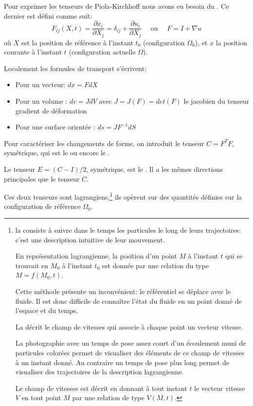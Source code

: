 \medskip
Pour exprimer les tenseurs de Piola-Kirchhoff 
nous avons eu besoin du . Ce dernier est défini comme suit:
\begin{equation} F_{ij}(X,t) = \dfrac{\partial x_i}{\partial X_j} = \delta_{ij} + \frac{\partial u_i}{\partial X_j} 
\quad \text{ ou } \quad F = I + \nabla u\end{equation}
où $X$ est la position de référence à l'instant $t_0$ (configuration $\Omega_0$), et $x$ la position 
courante à l'instant $t$ (configuration actuelle $\Omega$).

\medskip
Localement les formules de transport s'écrivent:
\begin{itemize}
   \item Pour un vecteur: $dx = F dX$
   \item Pour un volume : $dv = J dV$ avec $J= J(F) = det(F)$ le jacobien du tenseur gradient de déformation
   \item Pour une surface orientée : $ds = J F^{-1} dS$
\end{itemize}

\medskip
Pour caractériser les changements de forme, on introduit le tenseur $C = F^TF$, symétrique, qui est le 
 ou encore le .

Le tenseur $E = (C-I)/2$, symétrique, est le . 
Il a les mêmes directions principales que le tenseur $C$. 

Ces deux tenseurs sont lagrangiens,\footnote{%
la  consiste à suivre dans le temps les particules le long de 
leurs trajectoires: c'est une description intuitive de leur mouvement. 

En représentation lagrangienne, la position d'un point $M$ à l'instant $t$ qui se trouvait en $M_0$ à
l'instant $t_0$ est donnée par une relation du type $M = f(M_0,t)$.

Cette méthode présente un inconvénient: le référentiel se déplace avec le fluide. 
Il est donc difficile de connaître l'état du fluide en un point donné de l'espace et du temps.

\medskip
La  décrit le champ de vitesses qui associe à chaque point un 
vecteur vitesse. 

La photographie avec un temps de pose assez court d'un écoulement muni de particules colorées permet 
de visualiser des éléments de ce champ de vitesses à un instant donné. 
Au contraire un temps de pose plus long permet de visualiser des trajectoires de la description lagrangienne.

Le champ de vitesses est décrit en donnant à tout instant $t$ le vecteur vitesse $V$ en tout point $M$
par une relation de type $V(M,t)$.
} ils opèrent sur des quantités définies sur la configuration de référence 
$\Omega_0$.

